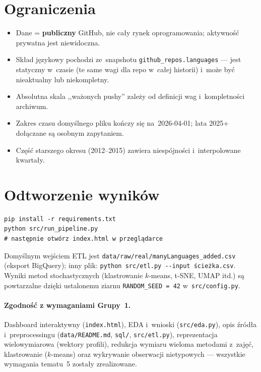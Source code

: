 \documentclass[11pt,a4paper]{article}
\begin{document}
\section{Ograniczenia}

\begin{itemize}[nosep]
  \item Dane = \textbf{publiczny} GitHub, nie cały rynek oprogramowania; aktywność prywatna jest niewidoczna.
  \item Skład językowy pochodzi ze~snapshotu \texttt{github\_repos.languages} --- jest statyczny w~czasie (te same wagi dla repo w~całej historii) i~może być nieaktualny lub niekompletny.
  \item Absolutna skala ,,ważonych pushy'' zależy od definicji wag i~kompletności archiwum.
  \item Zakres czasu domyślnego pliku kończy się na~2026-04-01; lata 2025+ dołączane są osobnym zapytaniem.
  \item Część starszego okresu (2012--2015) zawiera niespójności i~interpolowane kwartały.
\end{itemize}

\section{Odtworzenie wyników}

\begin{verbatim}
pip install -r requirements.txt
python src/run_pipeline.py
# następnie otwórz index.html w przeglądarce
\end{verbatim}

Domyślnym wejściem ETL jest \texttt{data/raw/real/manyLanguages\_added.csv} (eksport BigQuery);
inny plik: \texttt{python src/etl.py -{}-input ścieżka.csv}. Wyniki metod stochastycznych
(klastrowanie $k$-means, t-SNE, UMAP itd.) są powtarzalne dzięki ustalonemu ziarnu
\texttt{RANDOM\_SEED = 42} w~\texttt{src/config.py}.

\paragraph{Zgodność z wymaganiami Grupy~1.} Dashboard interaktywny (\texttt{index.html}),
EDA i~wnioski (\texttt{src/eda.py}), opis źródła i~preprocessingu (\texttt{data/README.md},
\texttt{sql/}, \texttt{src/etl.py}), reprezentacja wielowymiarowa (wektory profili),
redukcja wymiaru wieloma metodami z~zajęć, klastrowanie ($k$-means) oraz wykrywanie obserwacji
nietypowych --- wszystkie wymagania tematu~5 zostały zrealizowane.
\end{document}
